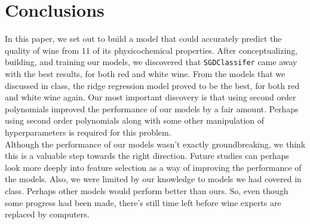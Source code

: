 
\section{Conclusions}
\label{sec:concl}

In this paper, we set out to build a model that could accurately predict the quality of wine from $11$ of its physicochemical properties. After conceptualizing, building, and training our models, we discovered that \texttt{SGDClassifer} came away with the best results, for both red and white wine. From the models that we discussed in class, the ridge regression model proved to be the best, for both red and white wine again. Our most important discovery is that using second order polynomials improved the performance of our models by a fair amount. Perhaps using second order polynomials along with some other manipulation of hyperparameters is required for this problem.\\

Although the performance of our models wasn't exactly groundbreaking, we think this is a valuable step towards the right direction. Future studies can perhaps look more deeply into feature selection as a way of improving the performance of the models. Also, we were limited by our knowledge to models we had covered in class. Perhaps other models would perform better than ours. So, even though some progress had been made, there's still time left before wine experts are replaced by computers.
